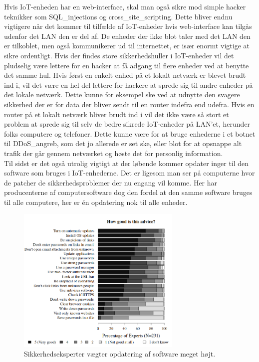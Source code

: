     Hvis IoT-enheden har en web-interface, skal man også sikre mod simple hacker teknikker som \Glspl{SQL_injection} og \gls{cross_site_scripting}. Dette bliver endnu vigtigere når det kommer til tilfælde af IoT-enheder hvis web-interface kan tilgås udenfor det LAN 
    den er del af. De enheder der ikke blot taler med det LAN den er tilkoblet, men også kommunikerer ud til internettet, er især enormt vigtige at sikre ordentligt. 
    Hvis der findes store sikkerhedshuller i IoT-enheder vil det pludselig være lettere for en hacker at få adgang til flere enheder ved at benytte det samme hul. Hvis først en enkelt enhed på et lokalt netværk er blevet brudt ind i, vil det være en hel del lettere for hackere at sprede sig til andre enheder på det lokale netværk. 
    Dette kunne for eksempel ske ved at udnytte den svagere sikkerhed der er for data der bliver sendt til en router indefra end udefra. Hvis en router på et lokalt netværk bliver brudt ind i vil det ikke være så stort et problem at sprede sig til selv de bedre sikrede IoT-enheder på LAN'et, herunder folks computere og telefoner. Dette kunne være for at bruge enhederne i et \gls{botnet} til \Gls{DDoS_angreb}, som det jo allerede er set ske, eller blot for at opsnappe alt trafik der går gennem netværket og høste det for personlig information.\\
    Til sidst er det også utrolig vigtigt at der løbende kommer opdater inger til den software som bruges i IoT-enhederne. Det er ligesom man ser på computerne hvor de patcher de sikkerhedsproblemer der nu engang vil komme. Her har producenterne af computersoftware dog den fordel at den samme software bruges til alle computere, her er én opdatering nok til alle enheder. \\
    \begin{figure}[H]
        \centering
            \includegraphics[width=0.7\textwidth]{figures/importance_of_updates.png}
        \caption{Sikkerhedseksperter vægter opdatering af software meget højt.\autocite{soups2015}}\label{fig:updates}
    \end{figure}
